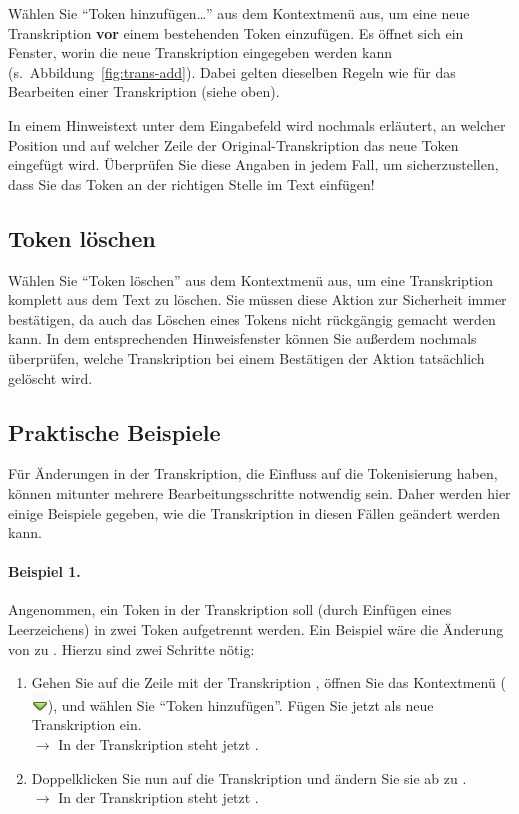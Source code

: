 \documentclass[11pt,a4paper,parskip=half]{scrartcl}
\begin{document}
Wählen Sie "`Token hinzufügen\ldots"' aus dem Kontextmenü aus, um eine
neue Transkription \textbf{vor} einem bestehenden Token einzufügen.
Es öffnet sich ein Fenster, worin die neue Transkription eingegeben
werden kann (s.\ Abbildung~\ref{fig:trans-add}).  Dabei gelten
dieselben Regeln wie für das Bearbeiten einer Transkription (siehe
oben).

In einem Hinweistext unter dem Eingabefeld wird nochmals erläutert, an
welcher Position und auf welcher Zeile der Original-Transkription das
neue Token eingefügt wird.  Überprüfen Sie diese Angaben in jedem
Fall, um sicherzustellen, dass Sie das Token an der richtigen Stelle
im Text einfügen!

\subsection{Token löschen}

Wählen Sie "`Token löschen"' aus dem Kontextmenü aus, um eine
Transkription komplett aus dem Text zu löschen.  Sie müssen diese
Aktion zur Sicherheit immer bestätigen, da auch das Löschen eines
Tokens nicht rückgängig gemacht werden kann.  In dem entsprechenden
Hinweisfenster können Sie außerdem nochmals überprüfen, welche
Transkription bei einem Bestätigen der Aktion tatsächlich gelöscht
wird.

\subsection{Praktische Beispiele}
\label{sec:trans-bsp}

Für Änderungen in der Transkription, die Einfluss auf die
Tokenisierung haben, können mitunter mehrere Bearbeitungsschritte
notwendig sein.  Daher werden hier einige Beispiele gegeben, wie die
Transkription in diesen Fällen geändert werden kann.

\paragraph{Beispiel 1.}  Angenommen, ein Token in der Transkription
soll (durch Einfügen eines Leerzeichens) in zwei Token aufgetrennt
werden.  Ein Beispiel wäre die Änderung von  zu
.  Hierzu sind zwei Schritte nötig:
\begin{enumerate}
\item Gehen Sie auf die Zeile mit der Transkription ,
  öffnen Sie das Kontextmenü
  (\includegraphics[height=\baselineskip]{img/dropdown.png}), und
  wählen Sie "`Token hinzufügen"'.  Fügen Sie jetzt  als
  neue Transkription ein.\\$\to$ In der Transkription steht jetzt
  .
\item Doppelklicken Sie nun auf die Transkription  und
  ändern Sie sie ab zu .\\$\to$ In der Transkription steht
  jetzt .
\end{enumerate}
\end{document}

